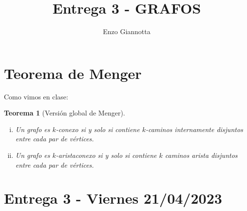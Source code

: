 \documentclass[12pt]{report}
\title{Entrega 3 - GRAFOS}
\author{Enzo Giannotta}
\theoremstyle{plain}
\newtheorem{theorem}{Teorema}[section]
\theoremstyle{definition}
\begin{document}
\maketitle

\section{Teorema de Menger}
Como vimos en clase:

\begin{theorem}[Versión global de Menger]\label{Menger global}
\begin{enumerate}[(i)]
\item Un grafo es $k$-conexo si y solo si contiene $k$-caminos internamente disjuntos entre cada par de vértices.
\item Un grafo es $k$-aristaconexo si y solo si contiene $k$ caminos arista disjuntos entre cada par de vértices.
\end{enumerate}
\end{theorem}

\section{Entrega 3 - Viernes 21/04/2023}
\end{document}

